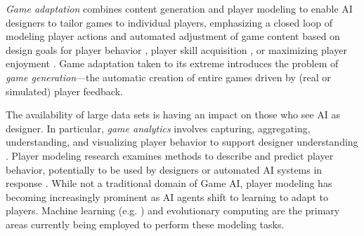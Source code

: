 \documentclass[conference]{IEEEtran}
\newcommand{\mytodo}[1]{\textbf{[[#1]]}}
\begin{document}
{\em Game adaptation} combines content generation and player modeling to enable AI designers to tailor games to individual players, emphasizing a closed loop of modeling player actions and automated adjustment of game content based on design goals for player behavior \cite{smith2012:refraction}, player skill acquisition \cite{andersen2013:trace}, or maximizing player enjoyment \cite{yu2012:prefix-based, thue2007:storytell-pm, shaker2010:platformer-gen}.
%
Game adaptation taken to its extreme introduces the problem of {\em game generation}---the automatic creation of entire games driven by (real or simulated) player feedback.

The availability of large data sets is having an impact on those who see AI as designer.
In particular, {\em game analytics} involves capturing, aggregating, understanding, and visualizing player behavior to support designer understanding \cite{seifel-nasr2013:game-analytics-book}. 
Player modeling research examines methods to describe and predict player behavior, potentially to be used by designers or automated AI systems in response \cite{smith2011:playermodel}. 
While not a traditional domain of Game AI, player modeling has becoming increasingly prominent as AI agents shift to learning to adapt to players. 
Machine learning (e.g. \cite{harrison2011:wow-seq-pred, weber2011:playermodel}) and evolutionary computing \cite{yannakakis2011:edpcg} are the primary areas currently being employed to perform these modeling tasks. %

\end{document}
